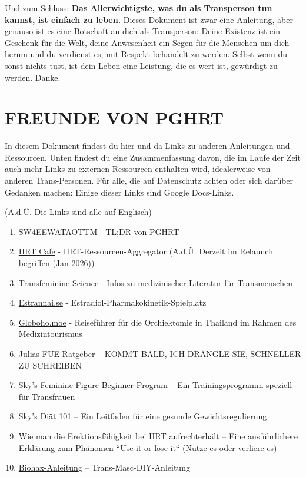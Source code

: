 \documentclass{article}
\begin{document}
Und zum Schluss: \textbf{Das Allerwichtigste, was du als Transperson tun kannst, ist einfach zu leben.} Dieses Dokument ist zwar eine Anleitung, aber genauso ist es eine Botschaft an dich als Transperson: Deine Existenz ist ein Geschenk für die Welt, deine Anwesenheit ein Segen für die Menschen um dich herum und du verdienst es, mit Respekt behandelt zu werden. Selbst wenn du sonst nichts tust, ist dein Leben eine Leistung, die es wert ist, gewürdigt zu werden. Danke.

\section*{FREUNDE VON PGHRT}\label{FOPGHRT}

In diesem Dokument findest du hier und da Links zu anderen Anleitungen und Ressourcen. Unten findest du eine Zusammenfassung davon, die im Laufe der Zeit auch mehr Links zu externen Ressourcen enthalten wird, idealerweise von anderen Trans-Personen. Für alle, die auf Datenschutz achten oder sich darüber Gedanken machen: Einige dieser Links sind Google Docs-Links.

(A.d.Ü. Die Links sind alle auf Englisch)

\begin{enumerate}
  \item \href{https://startwith4mgestradiolenanthateweeklyandtestatonetothreemonths.com/}{SW4EEWATAOTTM} - TL;DR von PGHRT
  \item \href{https://hrtcafe.net/}{HRT Cafe} - HRT-Ressourcen-Aggregator (A.d.Ü. Derzeit im Relaunch begriffen (Jan 2026))
  \item \href{https://transfemscience.org/}{Transfeminine Science} - Infos zu medizinischer Literatur für Transmenschen
  \item \href{https://estrannai.se}{Estrannai.se} - Estradiol-Pharmakokinetik-Spielplatz
  \item \href{https://globoho.moe/}{Globoho.moe} - Reiseführer für die Orchiektomie in Thailand im Rahmen des Medizintourismus
  \item Julias FUE-Ratgeber – KOMMT BALD, ICH DRÄNGLE SIE, SCHNELLER ZU SCHREIBEN
  \item \href{https://docs.google.com/document/d/1-NyE5EY5TTaRRMhk7HlTbKJ7HifjEsA4jlDO1qKQVl0/edit?tab=t.0}{Sky's Feminine Figure Beginner Program} – Ein Trainingsprogramm speziell für Transfrauen
  \item \href{https://docs.google.com/document/d/114sztSw1aVWM2pXLDl9NrHklyvewz3EmFiHiisjM71k/edit?tab=t.0}{Sky's Diät 101} – Ein Leitfaden für eine gesunde Gewichtsregulierung
  \item \href{https://stainedglasswoman.substack.com/p/how-to-maintain-your-penis-function}{Wie man die Erektionsfähigkeit bei HRT aufrechterhält} – Eine ausführlichere Erklärung zum Phänomen “Use it or lose it“ (Nutze es oder verliere es)
  \item \href{https://mega.nz/folder/cfwSmBbY#ify6kaueB8SdDD1v12t2Dw}{Biohax-Anleitung} – Trans-Masc-DIY-Anleitung
\end{enumerate}
\end{document}

